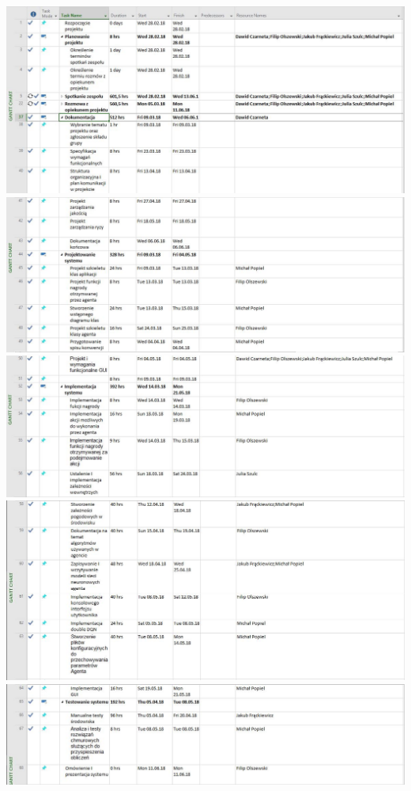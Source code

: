 \documentclass{article}
\begin{document}
\includegraphics[width=1\textwidth, left]{final/1.jpg}
\includegraphics[width=1\textwidth, left]{final/2.jpg}
\includegraphics[width=1\textwidth, left]{final/3.jpg}
\includegraphics[width=1\textwidth, left]{final/4.jpg}
\includegraphics[width=1\textwidth, left]{final/5.jpg}
\end{document}
